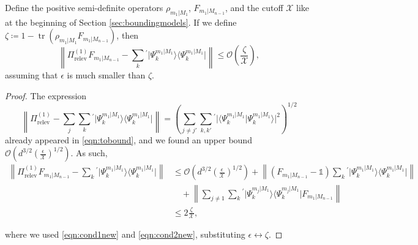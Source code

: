 \begin{lemma}
\label{lem:approxproj}
Define the positive semi-definite operators $\rho_{m_1\vert M_1}$, $F_{m_1\vert M_{n-1}}$, and the cutoff $\mathcal{X}$ like at the beginning of Section \ref{sec:boundingmodels}. If we define $ \zeta\coloneqq 1- \operatorname{tr}(\rho_{m_1\vert M_1}F_{m_1 \vert M_{n-1}})$, then \[\left\|\Pi_{\text{relev}}^{(1)}F_{m_1\vert M_{n-1}}-\sum_k{}^{'}\vert \Psi_k^{m_1\vert M_1} \rangle \langle \Psi_k^{m_1\vert M_1} \vert \right\|\leq \mathcal{O}\left(\frac{\zeta}{\mathcal{X}}\right),\]
assuming that $\epsilon$ is much smaller than $\zeta$.
\end{lemma}
\begin{proof}
The expression \[\left\| \Pi_{\text{relev}}^{(1)}-\sum_j \sum_k{}^{'}\vert \Psi_k^{m_1\vert M_1}\rangle \langle \Psi_k^{m_1\vert M_1} \vert \right\| =  \left(\sum_{j\neq j'}\sum_{k,k'}{}^{'}\vert \langle \Psi_k^{m_1\vert M_1} \vert  \Psi_k^{m_1\vert M_1} \rangle \vert ^2 \right)^{1/2}\] already appeared in \ref{eqn:tobound}, and we found an upper bound $\mathcal{O}\left(d^{3/2}\left(\frac{\epsilon}{\mathcal{X}}\right)^{1/2}\right)$. As such,
\[\begin{split}
\left\|\Pi_{\text{relev}}^{(1)}F_{m_1\vert M_{n-1}}-\sum_k{}^{'}\vert \Psi_k^{m_1\vert M_1} \rangle \langle \Psi_k^{m_1\vert M_1} \vert \right\| & \leq \mathcal{O}\left(d^{3/2}\left(\frac{\epsilon}{\mathcal{X}}\right)^{1/2}\right) + \left\| \left(F_{m_1\vert M_{n-1}}-\mathbb{1}\right)\sum_k{}^{'}\vert \Psi_k^{m_1\vert M_1}\rangle \langle \Psi_k^{m_1\vert M_1} \vert \right\| \\[0.5em]
&\hspace{1em} +\left\|\sum_{j\neq 1}\sum_k{}^{'}\vert \Psi_k^{m_j\vert M_1} \rangle \langle \Psi_k^{m_j\vert M_1} \vert F_{m_1\vert M_{n-1}}\right\| \\[0.8em]
& \leq 2 \frac{\zeta}{\mathcal{X}},
\end{split}\]

where we used \ref{eqn:cond1new} and \ref{eqn:cond2new}, substituting $\epsilon\leftrightarrow \zeta$.

\end{proof}

